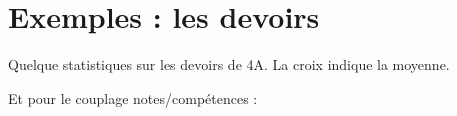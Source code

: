 

\section{Exemples : les devoirs}

Quelque statistiques sur les devoirs de 4A. La croix indique la moyenne.

\begin{center}
   
\end{center}

Et pour le couplage notes/compétences :
\begin{center}

\end{center}

